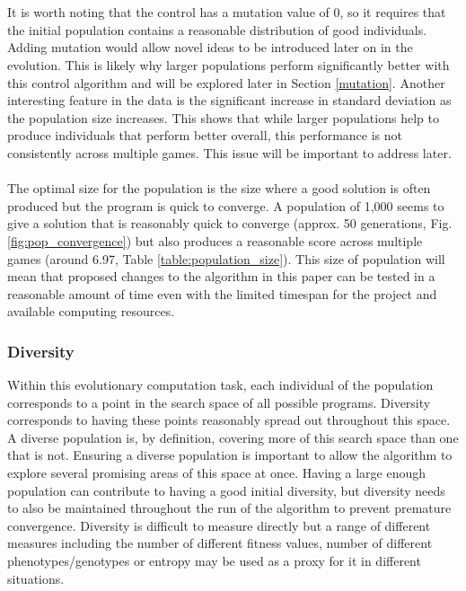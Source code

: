 \documentclass[12pt]{article}
\begin{document}
\\\\
It is worth noting that the control has a mutation value of 0, so it requires that the initial population contains a reasonable distribution of good individuals. Adding mutation would allow novel ideas to be introduced later on in the evolution. This is likely why larger populations perform significantly better with this control algorithm and will be explored later in Section \ref{mutation}. Another interesting feature in the data is the significant increase in standard deviation as the population size increases. This shows that while larger populations help to produce individuals that perform better overall, this performance is not consistently across multiple games. This issue will be important to address later.
\\\\
The optimal size for the population is the size where a good solution is often produced but the program is quick to converge\cite{optimal_population_size}. A population of 1,000 seems to give a solution that is reasonably quick to converge (approx. 50 generations, Fig. \ref{fig:pop_convergence}) but also produces a reasonable score across multiple games (around 6.97, Table \ref{table:population_size}). This size of population will mean that proposed changes to the algorithm in this paper can be tested in a reasonable amount of time even with the limited timespan for the project and available computing resources.

\subsubsection{Diversity}
Within this evolutionary computation task, each individual of the population corresponds to a point in the search space of all possible programs. Diversity corresponds to having these points reasonably spread out throughout this space. A diverse population is, by definition, covering more of this search space than one that is not. Ensuring a diverse population is important to allow the algorithm to explore several promising areas of this space at once\cite{diversity_recommended}. Having a large enough population can contribute to having a good initial diversity, but diversity needs to also be maintained throughout the run of the algorithm to prevent premature convergence. Diversity is difficult to measure directly but a range of different measures including the number of different fitness values, number of different phenotypes/genotypes or entropy may be used as a proxy for it in different situations\cite{textbook}. 
\end{document}
